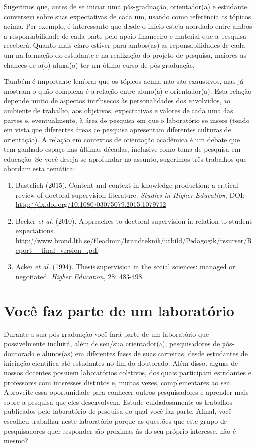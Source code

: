 \documentclass[twoside a4paper 12pt]{report}
\begin{document}
Sugerimos que, antes de se iniciar uma pós-graduação, orientador(a) e estudante conversem sobre suas expectativas de cada um, usando como referência os tópicos acima. Por exemplo, é interessante que desde o início esteja acordado entre ambos a responsabilidade de cada parte pelo apoio financeiro e material que a pesquisa receberá. Quanto mais claro estiver para ambos(as) as reponsabilidades de cada um na formação do estudante e na realização do projeto de pesquisa, maiores as chances de a(o) aluna(o) ter um ótimo curso de pós-graduação.

Também é importante lembrar que os tópicos acima não são exaustivos, mas já mostram o quão complexa é a relação entre aluno(a) e orientador(a). Esta relação depende muito de aspectos intrínsecos às personalidades dos envolvidos, ao ambiente de trabalho, aos objetivos, expectativas e valores de cada uma das partes e, eventualmente, à área de pesquisa em que o laboratório se insere (tendo em vista que diferentes áreas de pesquisa apresentam diferentes culturas de orientação). A relação em contextos de orientação acadêmica é um debate que tem ganhado espaço nas últimas décadas, inclusive como tema de pesquisa em educação. Se você deseja se aprofundar no assunto, sugerimos três trabalhos que abordam esta temática:
\begin{enumerate}
\item Bastalich (2015). Content and context in knowledge production: a critical review of
doctoral supervision literature. \textit{Studies in Higher Education}, DOI: {\url{http://dx.doi.org/10.1080/03075079.2015.1079702}}
\item Becker \textit{et al}. (2010). Approaches to doctoral supervision in relation to student expectations. {\url{http://www.brand.lth.se/fileadmin/brandteknik/utbild/Pedagogik/resurser/Report__final_version_.pdf}}
\item Acker \textit{et al}. (1994). Thesis supervision in the social sciences: managed or negotiated. \textit{Higher Education}, 28: 483-498.
\end{enumerate}

\section{Você faz parte de um laboratório}

Durante a sua pós-graduação você fará parte de um laboratório que possivelmente incluirá, além de seu/sua orientador(a), pesquisadores de pós-doutorado e alunos(as) em diferentes fases de suas carreiras, desde estudantes de iniciação científica até estudantes no fim do doutorado. Além disso, alguns de nossos docentes possuem laboratórios coletivos, dos quais participam estudantes e professores com interesses distintos e, muitas vezes, complementares ao seu. Aproveite essa oportunidade para conhecer outros pesquisadores e aprender mais sobre a pesquisa que eles desenvolvem. Estude cuidadosamente os trabalhos publicados pelo laboratório de pesquisa do qual você faz parte. Afinal, você escolheu trabalhar neste laboratório porque as questões que este grupo de pesquisadores quer responder são próximas às do seu próprio interesse, não é mesmo?
\end{document}
